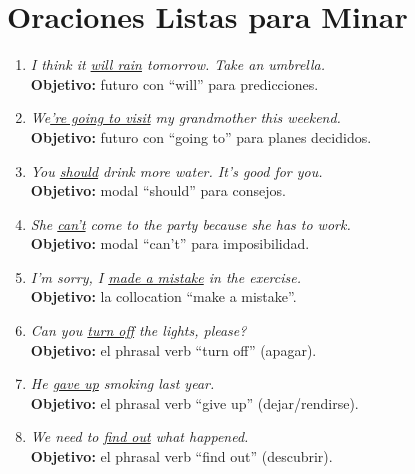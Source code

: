 \documentclass[12pt,a4paper]{article}
\begin{document}
\section{Oraciones Listas para Minar}

\begin{cajamineria}

\begin{enumerate}[leftmargin=1.2cm]
  \item \textit{I think it \underline{will rain} tomorrow. Take an umbrella.}\\
    {\small\textbf{Objetivo:} futuro con ``will'' para predicciones.}

  \item \textit{We\underline{'re going to visit} my grandmother this weekend.}\\
    {\small\textbf{Objetivo:} futuro con ``going to'' para planes decididos.}

  \item \textit{You \underline{should} drink more water. It's good for you.}\\
    {\small\textbf{Objetivo:} modal ``should'' para consejos.}

  \item \textit{She \underline{can't} come to the party because she has to work.}\\
    {\small\textbf{Objetivo:} modal ``can't'' para imposibilidad.}

  \item \textit{I'm sorry, I \underline{made a mistake} in the exercise.}\\
    {\small\textbf{Objetivo:} la collocation ``make a mistake''.}

  \item \textit{Can you \underline{turn off} the lights, please?}\\
    {\small\textbf{Objetivo:} el phrasal verb ``turn off'' (apagar).}

  \item \textit{He \underline{gave up} smoking last year.}\\
    {\small\textbf{Objetivo:} el phrasal verb ``give up'' (dejar/rendirse).}

  \item \textit{We need to \underline{find out} what happened.}\\
    {\small\textbf{Objetivo:} el phrasal verb ``find out'' (descubrir).}


\end{enumerate}
\end{cajamineria}
\end{document}
